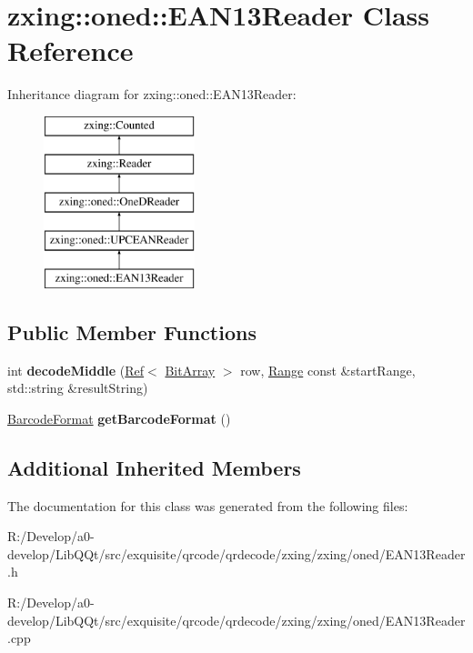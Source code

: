 \hypertarget{classzxing_1_1oned_1_1_e_a_n13_reader}{}\section{zxing\+:\+:oned\+:\+:E\+A\+N13\+Reader Class Reference}
\label{classzxing_1_1oned_1_1_e_a_n13_reader}
Inheritance diagram for zxing\+:\+:oned\+:\+:E\+A\+N13\+Reader\+:\begin{figure}[H]
\begin{center}
\leavevmode
\includegraphics[height=5.000000cm]{classzxing_1_1oned_1_1_e_a_n13_reader}
\end{center}
\end{figure}
\subsection*{Public Member Functions}
\begin{DoxyCompactItemize}
\item 
\mbox{\label{classzxing_1_1oned_1_1_e_a_n13_reader_aacf8c756a60b1d2e967b24a9c688e208}} 
int {\bfseries decode\+Middle} (\mbox{\hyperlink{classzxing_1_1_ref}{Ref}}$<$ \mbox{\hyperlink{classzxing_1_1_bit_array}{Bit\+Array}} $>$ row, \mbox{\hyperlink{structzxing_1_1oned_1_1_one_d_reader_1_1_range}{Range}} const \&start\+Range, std\+::string \&result\+String)
\item 
\mbox{\label{classzxing_1_1oned_1_1_e_a_n13_reader_a8e8c965ce13868856fe3d7d1cc3b51d7}} 
\mbox{\hyperlink{classzxing_1_1_barcode_format}{Barcode\+Format}} {\bfseries get\+Barcode\+Format} ()
\end{DoxyCompactItemize}
\subsection*{Additional Inherited Members}


The documentation for this class was generated from the following files\+:\begin{DoxyCompactItemize}
\item 
R\+:/\+Develop/a0-\/develop/\+Lib\+Q\+Qt/src/exquisite/qrcode/qrdecode/zxing/zxing/oned/E\+A\+N13\+Reader.\+h\item 
R\+:/\+Develop/a0-\/develop/\+Lib\+Q\+Qt/src/exquisite/qrcode/qrdecode/zxing/zxing/oned/E\+A\+N13\+Reader.\+cpp\end{DoxyCompactItemize}
